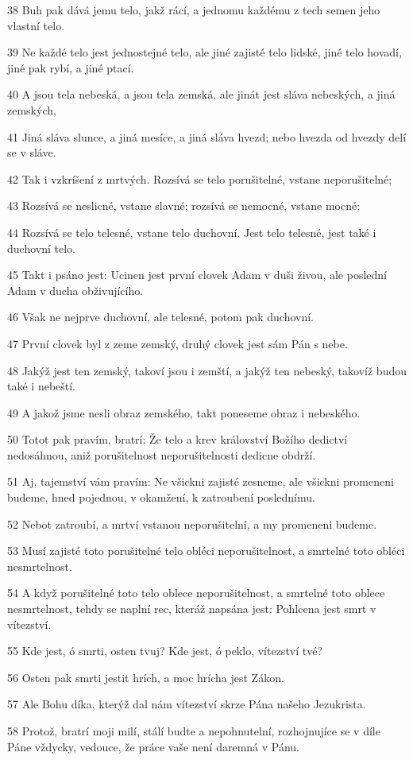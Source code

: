 \par 38 Buh pak dává jemu telo, jakž rácí, a jednomu každému z tech semen jeho vlastní telo.
\par 39 Ne každé telo jest jednostejné telo, ale jiné zajisté telo lidské, jiné telo hovadí, jiné pak rybí, a jiné ptací.
\par 40 A jsou tela nebeská, a jsou tela zemská, ale jinát jest sláva nebeských, a jiná zemských,
\par 41 Jiná sláva slunce, a jiná mesíce, a jiná sláva hvezd; nebo hvezda od hvezdy delí se v sláve.
\par 42 Tak i vzkríšení z mrtvých. Rozsívá se telo porušitelné, vstane neporušitelné;
\par 43 Rozsívá se neslicné, vstane slavné; rozsívá se nemocné, vstane mocné;
\par 44 Rozsívá se telo telesné, vstane telo duchovní. Jest telo telesné, jest také i duchovní telo.
\par 45 Takt i psáno jest: Ucinen jest první clovek Adam v duši živou, ale poslední Adam v ducha obživujícího.
\par 46 Však ne nejprve duchovní, ale telesné, potom pak duchovní.
\par 47 První clovek byl z zeme zemský, druhý clovek jest sám Pán s nebe.
\par 48 Jakýž jest ten zemský, takoví jsou i zemští, a jakýž ten nebeský, takovíž budou také i nebeští.
\par 49 A jakož jsme nesli obraz zemského, takt poneseme obraz i nebeského.
\par 50 Totot pak pravím, bratrí: Že telo a krev království Božího dedictví nedosáhnou, aniž porušitelnost neporušitelnosti dedicne obdrží.
\par 51 Aj, tajemství vám pravím: Ne všickni zajisté zesneme, ale všickni promeneni budeme, hned pojednou, v okamžení, k zatroubení poslednímu.
\par 52 Nebot zatroubí, a mrtví vstanou neporušitelní, a my promeneni budeme.
\par 53 Musí zajisté toto porušitelné telo obléci neporušitelnost, a smrtelné toto obléci nesmrtelnost.
\par 54 A když porušitelné toto telo oblece neporušitelnost, a smrtelné toto oblece nesmrtelnost, tehdy se naplní rec, kteráž napsána jest: Pohlcena jest smrt v vítezství.
\par 55 Kde jest, ó smrti, osten tvuj? Kde jest, ó peklo, vítezství tvé?
\par 56 Osten pak smrti jestit hrích, a moc hrícha jest Zákon.
\par 57 Ale Bohu díka, kterýž dal nám vítezství skrze Pána našeho Jezukrista.
\par 58 Protož, bratrí moji milí, stálí budte a nepohnutelní, rozhojnujíce se v díle Páne vždycky, vedouce, že práce vaše není daremná v Pánu.

